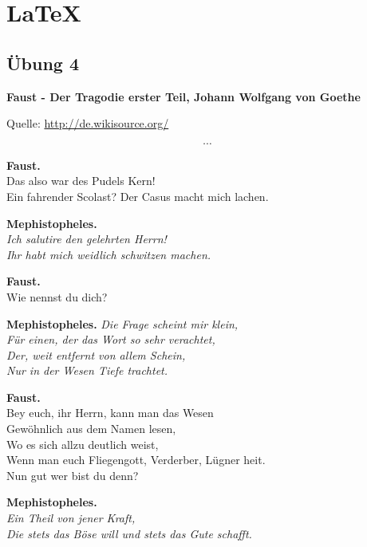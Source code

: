 \documentclass[12pt]{report}
\begin{document}
\part{\LaTeX}

\chapter{Übung 4}

\textbf{Faust - Der Tragodie erster Teil, Johann Wolfgang von Goethe}

Quelle: \url{http://de.wikisource.org/}

\[ \cdots \]

\textbf{Faust.} \\
Das also war des Pudels Kern! \\
Ein fahrender Scolast? Der Casus macht mich lachen. \\

\begin{flushright}
\textbf{Mephistopheles.} \\
\textit{Ich salutire den gelehrten Herrn! \\
Ihr habt mich weidlich schwitzen machen.}
\end{flushright}

\textbf{Faust.} \\
Wie nennst du dich?

\begin{flushright}
\textbf{Mephistopheles.}
\textit{Die Frage scheint mir klein, \\
Für einen, der das Wort so sehr verachtet, \\
Der, weit entfernt von allem Schein, \\
Nur in der Wesen Tiefe trachtet.}
\end{flushright}

\textbf{Faust.} \\
Bey euch, ihr Herrn, kann man das Wesen \\
Gewöhnlich aus dem Namen lesen, \\
Wo es sich allzu deutlich weist, \\
Wenn man euch Fliegengott, Verderber, Lügner heit. \\
Nun gut wer bist du denn?

\begin{flushright}
\textbf{Mephistopheles.} \\
\textit{Ein Theil von jener Kraft, \\
Die stets das Böse will und stets das Gute schafft.}
\end{flushright}
\end{document}
